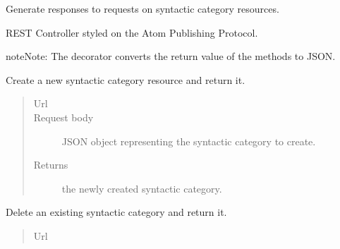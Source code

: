 \documentclass[letterpaper,10pt,english]{sphinxmanual}
\begin{document}
\begin{fulllineitems}
\label{api:onlinelinguisticdatabase.controllers.syntacticcategories.SyntacticcategoriesController}
Generate responses to requests on syntactic category resources.

REST Controller styled on the Atom Publishing Protocol.

\begin{notice}{note}{Note:}
The  decorator converts the return value of the methods to
JSON.
\end{notice}

\begin{fulllineitems}
\label{api:onlinelinguisticdatabase.controllers.syntacticcategories.SyntacticcategoriesController.create}
Create a new syntactic category resource and return it.
\begin{quote}\begin{description}
\item[{Url }] \leavevmode
{}

\item[{Request body}] \leavevmode
JSON object representing the syntactic category to create.

\item[{Returns}] \leavevmode
the newly created syntactic category.

\end{description}\end{quote}

\end{fulllineitems}


\begin{fulllineitems}
\label{api:onlinelinguisticdatabase.controllers.syntacticcategories.SyntacticcategoriesController.delete}
Delete an existing syntactic category and return it.
\begin{quote}\begin{description}
\item[{Url }] \leavevmode
{}


\end{description}
\end{quote}
\end{fulllineitems}
\end{fulllineitems}
\end{document}
